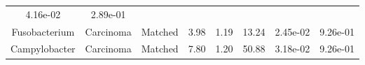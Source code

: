 \documentclass[12pt,]{article}
\begin{document}
\begin{longtable}[]{@{}cccccccc@{}}
\begin{minipage}[t]{0.06\columnwidth}
4.16e-02\strut
\end{minipage} & \begin{minipage}[t]{0.06\columnwidth}\centering\strut
2.89e-01\strut
\end{minipage}\tabularnewline
\begin{minipage}[t]{0.18\columnwidth}\centering\strut
Fusobacterium\strut
\end{minipage} & \begin{minipage}[t]{0.07\columnwidth}\centering\strut
Carcinoma\strut
\end{minipage} & \begin{minipage}[t]{0.09\columnwidth}\centering\strut
Matched\strut
\end{minipage} & \begin{minipage}[t]{0.03\columnwidth}\centering\strut
3.98\strut
\end{minipage} & \begin{minipage}[t]{0.14\columnwidth}\centering\strut
1.19\strut
\end{minipage} & \begin{minipage}[t]{0.14\columnwidth}\centering\strut
13.24\strut
\end{minipage} & \begin{minipage}[t]{0.06\columnwidth}\centering\strut
2.45e-02\strut
\end{minipage} & \begin{minipage}[t]{0.06\columnwidth}\centering\strut
9.26e-01\strut
\end{minipage}\tabularnewline
\begin{minipage}[t]{0.18\columnwidth}\centering\strut
Campylobacter\strut
\end{minipage} & \begin{minipage}[t]{0.07\columnwidth}\centering\strut
Carcinoma\strut
\end{minipage} & \begin{minipage}[t]{0.09\columnwidth}\centering\strut
Matched\strut
\end{minipage} & \begin{minipage}[t]{0.03\columnwidth}\centering\strut
7.80\strut
\end{minipage} & \begin{minipage}[t]{0.14\columnwidth}\centering\strut
1.20\strut
\end{minipage} & \begin{minipage}[t]{0.14\columnwidth}\centering\strut
50.88\strut
\end{minipage} & \begin{minipage}[t]{0.06\columnwidth}\centering\strut
3.18e-02\strut
\end{minipage} & \begin{minipage}[t]{0.06\columnwidth}\centering\strut
9.26e-01\strut
\end{minipage}\tabularnewline
\bottomrule
\end{longtable}
\end{document}
